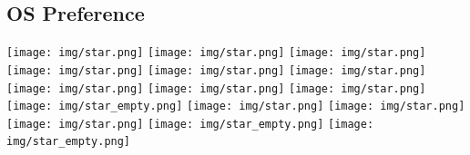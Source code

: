 \documentclass[]{cv-class}
\begin{document}
\begin{aside}
  \section{OS Preference}
    {\texttt{[image: img/star.png]}
    \texttt{[image: img/star.png]}
    \texttt{[image: img/star.png]}
    \texttt{[image: img/star.png]}
    \texttt{[image: img/star.png]}}
    {\texttt{[image: img/star.png]}
    \texttt{[image: img/star.png]}
    \texttt{[image: img/star.png]}
    \texttt{[image: img/star.png]}
    \texttt{[image: img/star\_empty.png]}}
    {\texttt{[image: img/star.png]}
    \texttt{[image: img/star.png]}
    \texttt{[image: img/star.png]}
    \texttt{[image: img/star\_empty.png]}
    \texttt{[image: img/star\_empty.png]}}
    ~
\end{aside}
\end{document}
